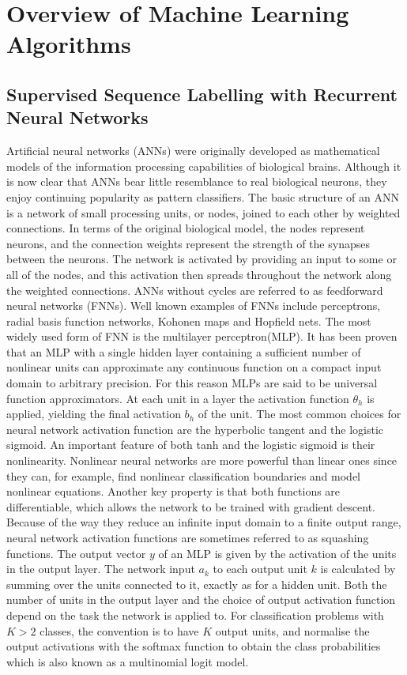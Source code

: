 \section{Overview of Machine Learning Algorithms}
\subsection{Supervised Sequence Labelling with Recurrent Neural Networks}
Artificial neural networks (ANNs) were originally developed as mathematical models of the information processing capabilities of biological brains. Although it is now clear that ANNs bear little resemblance to real biological neurons, they enjoy continuing popularity as pattern classifiers. The basic structure of an ANN is a network of small processing units, or nodes, joined to each other by weighted connections. In terms of the original biological model, the nodes represent neurons, and the connection weights represent the strength of the synapses between the neurons. The network is activated by providing an input to some or all of the nodes, and this activation then spreads throughout the network along the weighted connections. ANNs without cycles are referred to as feedforward neural networks (FNNs). Well known examples of FNNs include perceptrons, radial basis function networks, Kohonen maps and Hopfield nets. The most widely used form of FNN is the multilayer perceptron(MLP). It has been proven that an MLP with a single hidden layer containing a sufficient number of nonlinear units can approximate any continuous function on a compact input domain to arbitrary precision. For this reason MLPs are said to be universal function approximators.
At each unit in a layer the activation function $\theta_h$ is applied, yielding the final activation $b_h$ of the unit. The most common choices for neural network activation function are the hyperbolic tangent and the logistic sigmoid. An important feature of both tanh and the logistic sigmoid is their nonlinearity. Nonlinear neural networks are more powerful than linear ones since they can, for example, find nonlinear classification boundaries and model nonlinear equations. Another key property is that both functions are differentiable, which allows the network to be trained with gradient descent. Because of the way they reduce an infinite input domain to a finite output range, neural network activation functions are sometimes referred to as squashing functions. The output vector $y$ of an MLP is given by the activation of the units in the output layer. The network input $a_k$ to each output unit $k$ is calculated by summing over the units connected to it, exactly as for a hidden unit. Both the number of units in the output layer and the choice of output activation function depend on the task the network is applied to. For classification problems with $K > 2$ classes, the convention is to have $K$ output units, and normalise the output activations with the softmax function to obtain the class probabilities which is also known as a multinomial logit model.
